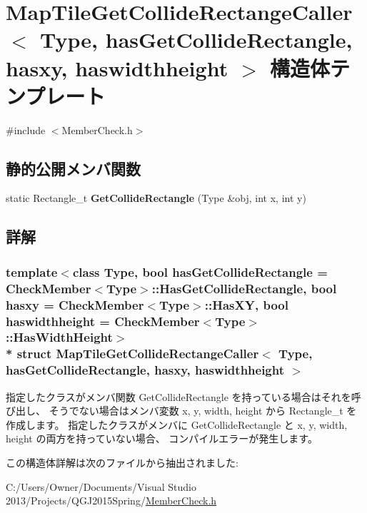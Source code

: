 \hypertarget{struct_map_tile_get_collide_rectange_caller}{}\section{Map\+Tile\+Get\+Collide\+Rectange\+Caller$<$ Type, has\+Get\+Collide\+Rectangle, hasxy, haswidthheight $>$ 構造体テンプレート}
\label{struct_map_tile_get_collide_rectange_caller}


{\ttfamily \#include $<$Member\+Check.\+h$>$}

\subsection*{静的公開メンバ関数}
\begin{DoxyCompactItemize}
\item 
static Rectangle\+\_\+t {\bfseries Get\+Collide\+Rectangle} (Type \&obj, int x, int y)\hypertarget{struct_map_tile_get_collide_rectange_caller_a6c880369b8119b9543d3b99bceb100ef}{}\label{struct_map_tile_get_collide_rectange_caller_a6c880369b8119b9543d3b99bceb100ef}

\end{DoxyCompactItemize}


\subsection{詳解}
\subsubsection*{template$<$class Type, bool has\+Get\+Collide\+Rectangle = Check\+Member$<$\+Type$>$\+::\+Has\+Get\+Collide\+Rectangle, bool hasxy = Check\+Member$<$\+Type$>$\+::\+Has\+XY, bool haswidthheight = Check\+Member$<$\+Type$>$\+::\+Has\+Width\+Height$>$\\*
struct Map\+Tile\+Get\+Collide\+Rectange\+Caller$<$ Type, has\+Get\+Collide\+Rectangle, hasxy, haswidthheight $>$}

指定したクラスがメンバ関数 Get\+Collide\+Rectangle を持っている場合はそれを呼び出し、 そうでない場合はメンバ変数 x, y, width, height から Rectangle\+\_\+t を作成します。 指定したクラスがメンバに Get\+Collide\+Rectangle と x, y, width, height の両方を持っていない場合、 コンパイルエラーが発生します。 

この構造体詳解は次のファイルから抽出されました\+:\begin{DoxyCompactItemize}
\item 
C\+:/\+Users/\+Owner/\+Documents/\+Visual Studio 2013/\+Projects/\+Q\+G\+J2015\+Spring/\hyperlink{_member_check_8h}{Member\+Check.\+h}\end{DoxyCompactItemize}
